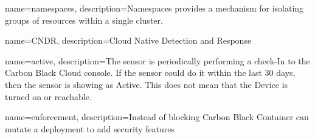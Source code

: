 {
	name={namespaces},
	description={Namespaces provides a mechanism for isolating groups of resources within a single cluster.}
}

{
	name={CNDR},
	description={Cloud Native Detection and Response}
}

{
	name={active},
	description={The sensor is periodically performing a check-In to the Carbon Black Cloud console. If the sensor could do it within the last 30 days, then the sensor is showing as Active. This does not mean that the Device is turned on or reachable.}
}

{
	name={enforcement},
	description={Instead of blocking Carbon Black Container can mutate a deployment to add security features}
}
